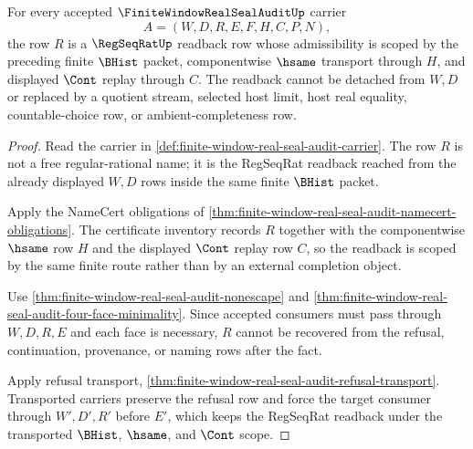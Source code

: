 \begin{theorem}
\label{thm:finite-window-real-seal-audit-regseqrat-scope}
For every accepted $\FiniteWindowRealSealAuditUp$ carrier
$$
A=(W,D,R,E,F,H,C,P,N),
$$
the row $R$ is a $\RegSeqRatUp$ readback row whose admissibility is scoped by the preceding finite $\BHist$ packet, componentwise $\hsame$ transport through $H$, and displayed $\Cont$ replay through $C$. The readback cannot be detached from $W,D$ or replaced by a quotient stream, selected host limit, host real equality, countable-choice row, or ambient-completeness row.
\end{theorem}
\begin{proof}
Read the carrier in \autoref{def:finite-window-real-seal-audit-carrier}. The row $R$ is not a free regular-rational name; it is the RegSeqRat readback reached from the already displayed $W,D$ rows inside the same finite $\BHist$ packet.

Apply the NameCert obligations of \autoref{thm:finite-window-real-seal-audit-namecert-obligations}. The certificate inventory records $R$ together with the componentwise $\hsame$ row $H$ and the displayed $\Cont$ replay row $C$, so the readback is scoped by the same finite route rather than by an external completion object.

Use \autoref{thm:finite-window-real-seal-audit-nonescape} and \autoref{thm:finite-window-real-seal-audit-four-face-minimality}. Since accepted consumers must pass through $W,D,R,E$ and each face is necessary, $R$ cannot be recovered from the refusal, continuation, provenance, or naming rows after the fact.

Apply refusal transport, \autoref{thm:finite-window-real-seal-audit-refusal-transport}. Transported carriers preserve the refusal row and force the target consumer through $W',D',R'$ before $E'$, which keeps the RegSeqRat readback under the transported $\BHist$, $\hsame$, and $\Cont$ scope.
\end{proof}

